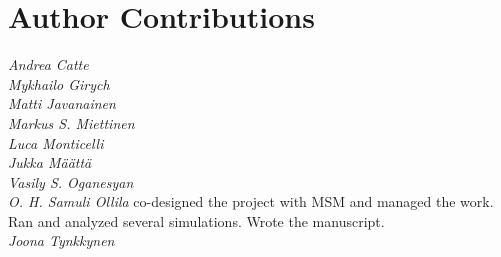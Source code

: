 \documentclass[pre,aps,floatfix,authordate1-4,twocolumn]{revtex4-1}
\begin{document}
\section{Author Contributions}
\noindent 
{\it Andrea Catte} \\
{\it Mykhailo Girych} \\
{\it Matti Javanainen} \\
{\it Markus S. Miettinen} \\
{\it Luca Monticelli}  \\
{\it Jukka M{\"a}{\"a}tt{\"a}}  \\
{\it Vasily S. Oganesyan} \\
{\it O. H. Samuli Ollila} co-designed the project with MSM and managed the work. Ran and analyzed several simulations. Wrote the manuscript. \\
{\it Joona Tynkkynen } \\

\listoftodos



\end{document}
